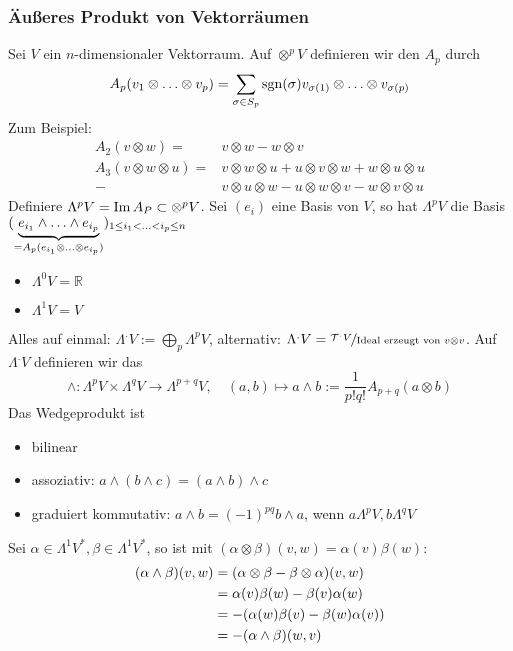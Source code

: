 \subsubsection{Äußeres Produkt von Vektorräumen}
\label{ssub:188}
Sei $V$ ein $n$-dimensionaler Vektorraum. Auf $\otimes^p V$ definieren wir den  $A_p$ durch
\[
A_p (v_1\otimes \ldots \otimes v_p) = \sum_{\sigma \in S_p} \operatorname{sgn}(\sigma) v_{\sigma(1)}\otimes \ldots \otimes v_{\sigma(p)}
\]
Zum Beispiel:
\begin{align*}
A_2(v\otimes w) = &v\otimes w - w\otimes v\\
A_3(v\otimes w\otimes u) = &v\otimes w\otimes u + u\otimes v \otimes w + w\otimes u \otimes u\\
 -& v\otimes u \otimes w - u\otimes w \otimes v - w\otimes v \otimes u
\end{align*}
Definiere $\Lambda^p V = \operatorname{Im} A_P \subset \otimes^p V$. Sei $(e_i)$ eine Basis von $V$, so hat $\Lambda^p V$ die Basis $(\underbrace{e_{i_1}\wedge \ldots \wedge e_{i_p}}_{= A_p(e_{i_1}\otimes \ldots \otimes e_{i_p})})_{1\leq i_1 < \ldots < i_p \leq n}$
\begin{itemize}
\item $\Lambda^0 V = \mathds{R}$
\item $\Lambda^1 V = V$
\end{itemize}
Alles auf einmal: $\Lambda^. V := \bigoplus\limits_p \Lambda^p V$, alternativ: $\Lambda^. V = \nicefrac{\mathcal{T}^. V}{\text{Ideal erzeugt von } v\otimes v}$. Auf $\Lambda^. V$ definieren wir das 
\[
\wedge: \Lambda^p V\times \Lambda^q V \to \Lambda^{p+q} V,\quad (a,b) \mapsto a\wedge b := \frac{1}{p!q!} A_{p+q}(a\otimes b)
\]
Das Wedgeprodukt ist
\begin{itemize}
\item bilinear
\item assoziativ: $a\wedge (b\wedge c) = (a\wedge b)\wedge c$
\item graduiert kommutativ: $a\wedge b = (-1)^{pq} b\wedge a$, wenn $a \Lambda^p V, b \Lambda^q V$
\end{itemize}
Sei $\alpha \in \Lambda^1 V^*, \beta \in \Lambda^1 V^*$, so ist mit $(\alpha \otimes \beta)(v,w) = \alpha(v)\beta(w)$:
\begin{align*}
(\alpha \wedge \beta)(v,w) &= (\alpha\otimes \beta - \beta \otimes \alpha)(v,w)\\
&= \alpha(v)\beta(w) - \beta(v)\alpha(w)\\
&= -(\alpha(w)\beta(v) - \beta(w)\alpha(v))\\
&= - (\alpha \wedge \beta)(w,v)
\end{align*}
